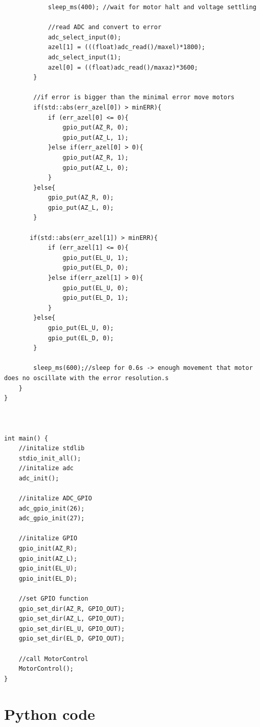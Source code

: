 \documentclass{article}
\begin{document}
\begin{lstlisting}
            sleep_ms(400); //wait for motor halt and voltage settling

            //read ADC and convert to error
            adc_select_input(0);
            azel[1] = (((float)adc_read()/maxel)*1800);
            adc_select_input(1);
            azel[0] = ((float)adc_read()/maxaz)*3600;
        }

        //if error is bigger than the minimal error move motors
        if(std::abs(err_azel[0]) > minERR){
            if (err_azel[0] <= 0){
                gpio_put(AZ_R, 0);
                gpio_put(AZ_L, 1);
            }else if(err_azel[0] > 0){
                gpio_put(AZ_R, 1);
                gpio_put(AZ_L, 0);
            }
        }else{
            gpio_put(AZ_R, 0);
            gpio_put(AZ_L, 0);
        }

       if(std::abs(err_azel[1]) > minERR){
            if (err_azel[1] <= 0){
                gpio_put(EL_U, 1);
                gpio_put(EL_D, 0);
            }else if(err_azel[1] > 0){
                gpio_put(EL_U, 0);
                gpio_put(EL_D, 1);
            }
        }else{
            gpio_put(EL_U, 0);
            gpio_put(EL_D, 0);
        }

        sleep_ms(600);//sleep for 0.6s -> enough movement that motor does no oscillate with the error resolution.s
    }
}



int main() {
    //initalize stdlib
    stdio_init_all();
    //initalize adc
    adc_init();

    //initalize ADC_GPIO
    adc_gpio_init(26);
    adc_gpio_init(27);

    //initalize GPIO
    gpio_init(AZ_R);
    gpio_init(AZ_L);
    gpio_init(EL_U);
    gpio_init(EL_D);

    //set GPIO function
    gpio_set_dir(AZ_R, GPIO_OUT);
    gpio_set_dir(AZ_L, GPIO_OUT);
    gpio_set_dir(EL_U, GPIO_OUT);
    gpio_set_dir(EL_D, GPIO_OUT);

    //call MotorControl
    MotorControl();
}

\end{lstlisting}

\newpage
\section*{Python code}
\lstset{style=mystyle, 
		language=Python}
		
\end{document}

